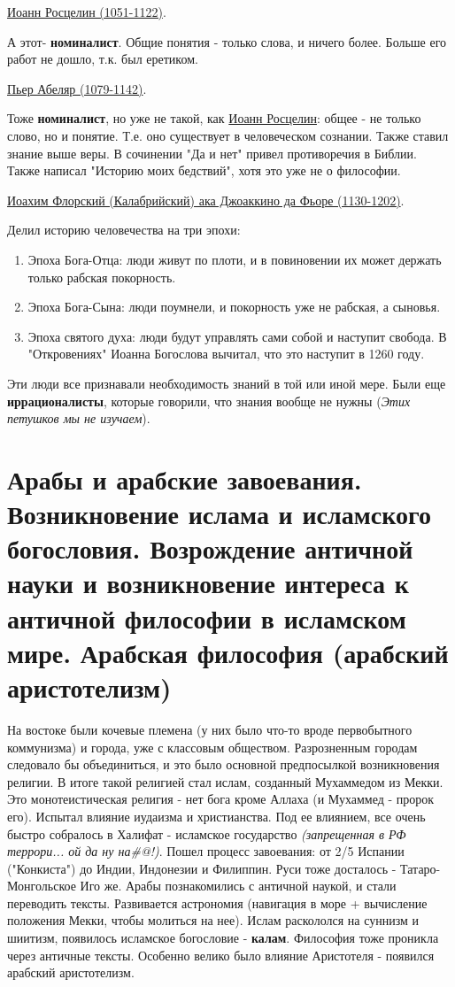 \documentclass[12pt,a4paper]{article}
\begin{document}
\underline{Иоанн Росцелин (1051-1122)}. 

А этот- \textbf{номиналист}. Общие понятия - только слова, и ничего более. 
Больше его работ не дошло, т.к. был еретиком.

\underline{Пьер Абеляр (1079-1142)}. 

Тоже \textbf{номиналист}, но уже не такой, как \underline{Иоанн Росцелин}: общее - не только слово, но и понятие. Т.е. оно существует в человеческом сознании. Также ставил знание выше веры. В сочинении "Да и нет" привел противоречия в Библии. Также написал "Историю моих бедствий", хотя это уже не о философии.

\underline{Иоахим Флорский (Калабрийский) ака Джоаккино да Фьоре  (1130-1202)}. 

Делил историю человечества на три эпохи:
\begin{enumerate}
\item Эпоха Бога-Отца: люди живут по плоти, и в повиновении их может держать только рабская покорность.
\item Эпоха Бога-Сына: люди поумнели, и покорность уже не рабская, а сыновья.
\item Эпоха святого духа: люди будут управлять сами собой и наступит свобода. В "Откровениях" Иоанна Богослова вычитал, что это наступит в 1260 году. 
\end{enumerate}

Эти люди все признавали необходимость знаний в той или иной мере. Были еще \textbf{иррационалисты}, которые говорили, что знания вообще не нужны (\textit{Этих петушков мы не изучаем}).

\section{Арабы и арабские завоевания. Возникновение ислама и исламского богословия. Возрождение античной науки и возникновение интереса к античной философии в исламском мире. Арабская философия (арабский аристотелизм)}
На востоке были кочевые племена (у них было что-то вроде первобытного коммунизма) и города, уже с классовым обществом.
Разрозненным городам следовало бы объединиться, и это было основной предпосылкой возникновения религии. В итоге такой религией стал ислам, созданный Мухаммедом из Мекки. Это монотеистическая религия - нет бога кроме Аллаха (и Мухаммед - пророк его). Испытал влияние иудаизма и христианства. Под ее влиянием, все очень быстро собралось в Халифат - исламское государство \textit{(запрещенная в РФ террори... ой да ну на\#@!)}. Пошел процесс завоевания: от 2/5 Испании ("Конкиста") до Индии, Индонезии и Филиппин. Руси тоже досталось - Татаро-Монгольское Иго же. Арабы познакомились с античной наукой, и стали переводить тексты. Развивается астрономия (навигация в море + вычисление положения Мекки, чтобы молиться на нее). Ислам раскололся на суннизм и шиитизм, появилось исламское богословие - \textbf{калам}. Философия тоже проникла через античные тексты. Особенно велико было влияние Аристотеля - появился арабский аристотелизм.
\end{document}
